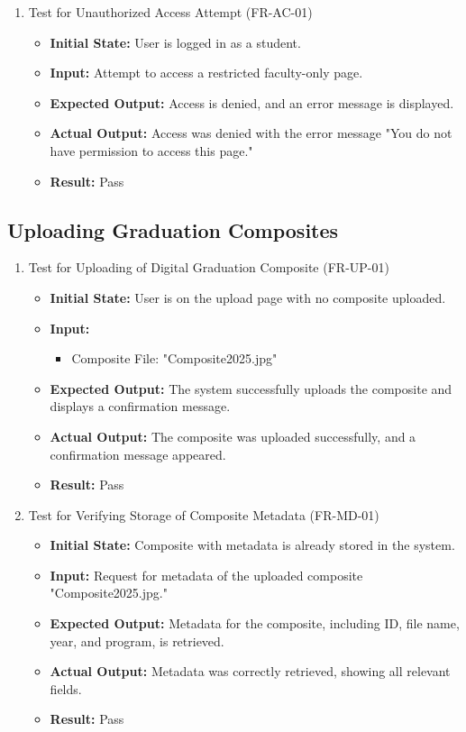 \documentclass[12pt, titlepage]{article}
\begin{document}
\begin{enumerate}
    \item Test for Unauthorized Access Attempt (FR-AC-01)
    \begin{itemize}
        \item \textbf{Initial State:} User is logged in as a student.
        \item \textbf{Input:} Attempt to access a restricted faculty-only page.
        \item \textbf{Expected Output:} Access is denied, and an error message is displayed.
        \item \textbf{Actual Output:} Access was denied with the error message "You do not have permission to access this page."
        \item \textbf{Result:} Pass
    \end{itemize}
\end{enumerate}

\subsection{Uploading Graduation Composites}
\begin{enumerate}
    
    \item Test for Uploading of Digital Graduation Composite (FR-UP-01)
    \begin{itemize}
        \item \textbf{Initial State:} User is on the upload page with no composite uploaded.
        \item \textbf{Input:} 
        \begin{itemize}
            \item Composite File: "Composite2025.jpg"
        \end{itemize}
        \item \textbf{Expected Output:} The system successfully uploads the composite and displays a confirmation message.
        \item \textbf{Actual Output:} The composite was uploaded successfully, and a confirmation message appeared.
        \item \textbf{Result:} Pass
    \end{itemize}
    
    \item Test for Verifying Storage of Composite Metadata (FR-MD-01)
    \begin{itemize}
        \item \textbf{Initial State:} Composite with metadata is already stored in the system.
        \item \textbf{Input:} Request for metadata of the uploaded composite "Composite2025.jpg."
        \item \textbf{Expected Output:} Metadata for the composite, including ID, file name, year, and program, is retrieved.
        \item \textbf{Actual Output:} Metadata was correctly retrieved, showing all relevant fields.
        \item \textbf{Result:} Pass
    \end{itemize}
\end{enumerate}
\end{document}
